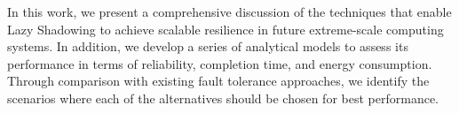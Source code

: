 In this work, we present a comprehensive discussion of the techniques that enable Lazy Shadowing to achieve scalable resilience in future extreme-scale computing systems. In addition, we develop a series of analytical models to assess its performance in terms of reliability, completion time, and energy consumption. 
Through comparison with existing fault tolerance approaches, we identify the scenarios where each of the alternatives should be chosen for best performance.










